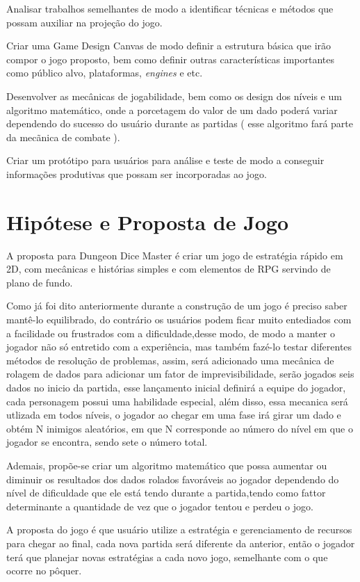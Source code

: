 \documentclass[12pt]{article}
\begin{document}
Analisar trabalhos semelhantes de modo a identificar técnicas e métodos que possam auxiliar na projeção do jogo.

Criar uma Game Design Canvas de modo  definir a estrutura básica que irão compor o jogo proposto, bem como definir outras características importantes como público alvo, plataformas, \emph{engines} e etc. 

Desenvolver as mecânicas de jogabilidade, bem como os design dos níveis e um algoritmo matemático, onde a porcetagem do valor de um dado poderá variar dependendo do sucesso do usuário durante as partidas ( esse algoritmo fará parte da mecãnica de combate ).

Criar um protótipo para usuários para análise e teste de modo a conseguir informações produtivas que possam ser incorporadas ao jogo.

\section{Hipótese e Proposta de Jogo}

A proposta para Dungeon Dice Master é criar um jogo de estratégia rápido em 2D, com mecânicas e histórias simples e com elementos de RPG servindo de plano de fundo.

Como já foi dito anteriormente durante a construção de um jogo é preciso saber mantê-lo equilibrado, do contrário os usuários podem ficar muito entediados com a facilidade ou frustrados com a dificuldade,desse modo, de modo a manter o jogador não só entretido com a experiência, mas também fazé-lo testar diferentes métodos de resolução de problemas, assim, será adicionado uma mecânica de rolagem de dados para adicionar um fator de imprevisibilidade, serão jogados seis dados no inicio da partida, esse lançamento inicial definirá a equipe do jogador, cada personagem possui uma habilidade especial, além disso, essa mecanica será utlizada em todos níveis, o jogador ao chegar em uma fase irá girar um dado e obtém N inimigos aleatórios, em que N corresponde ao número do nível em que o jogador se encontra, sendo sete o número total.

Ademais, propõe-se criar um algoritmo matemático que possa aumentar ou diminuir os resultados dos dados rolados favoráveis ao jogador dependendo do nível de dificuldade que ele está tendo durante a partida,tendo como fattor determinante a quantidade de vez que o jogador tentou e perdeu o jogo.

A proposta do jogo é que usuário utilize a estratégia e gerenciamento de recursos para chegar ao final, cada nova partida será diferente da anterior, então o jogador terá que planejar novas estratégias a cada novo jogo, semelhante com o que ocorre no pôquer.
\end{document}
